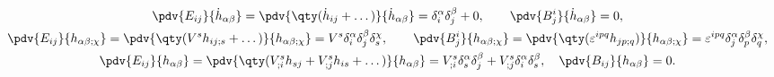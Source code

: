 \documentclass[\docroot/reports/draft/report.tex]{subfiles}
\begin{document}
    \begin{gather*}
        \pdv{E_{ij}}{\dot{h}_{\alpha\beta}} =
            \pdv{\qty(\dot{h}_{ij} + \dots)}{\dot{h}_{\alpha\beta}} =
            \delta_i^\alpha \delta_j^\beta + 0 , \qquad
        \pdv{B^i_j}{\dot{h}_{\alpha\beta}} = 0 , \\
        \pdv{E_{ij}}{h_{\alpha\beta;\chi}} =
            \pdv{\qty(V^s h_{ij;s} + \dots)}{h_{\alpha\beta;\chi}} =
            V^s \delta_i^\alpha \delta_j^\beta \delta_s^\chi , \qquad
        \pdv{B^i_j}{h_{\alpha\beta;\chi}} =
            \pdv{\qty(\varepsilon^{ipq}h_{jp;q})}{h_{\alpha\beta;\chi}} =
            \varepsilon^{ipq} \delta_j^\alpha \delta_p^\beta \delta_q^\chi , \\
        \pdv{E_{ij}}{h_{\alpha\beta}} =
            \pdv{\qty(V^s_{;i}h_{sj} + V^s_{;j}h_{is} + \dots)}{h_{\alpha\beta}} =
            V^s_{;i} \delta_s^\alpha \delta_j^\beta +
                V^s_{;j} \delta_i^\alpha \delta_s^\beta, \quad
        \pdv{B_{ij}}{h_{\alpha\beta}} = 0 .
    \end{gather*}
\end{document}
